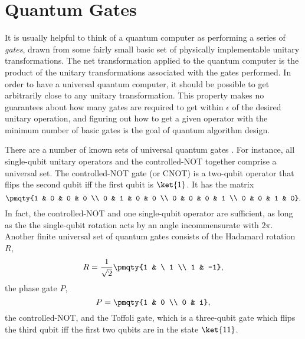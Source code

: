 \appendix

\chapter{Quantum Gates}
\label{app-gates}

It is usually helpful to think of a quantum computer as performing a series
of {\em gates}, drawn from some fairly small basic set of physically
implementable unitary transformations.  The net transformation applied
to the quantum computer is the product of the unitary transformations
associated with the gates performed.  In order to have a universal quantum
computer, it should be possible to get arbitrarily close to any unitary
transformation.  This property makes no guarantees about how many gates
are required to get within $\epsilon$ of the desired unitary operation,
and figuring out how to get a given operator with the minimum
number of basic gates is the goal of quantum algorithm design.

There are a number of known sets of universal quantum gates
\cite{lloyd-universal, gates}.  For instance, all single-qubit unitary
operators and the controlled-NOT together comprise a universal set.  The
controlled-NOT gate (or CNOT) is a two-qubit operator that flips the second
qubit iff the first qubit is $\ket{1}$.  It has the matrix
\begin{equation}
	\pmqty{1 & 0 & 0 & 0 \\ 0 & 1 & 0 & 0 \\ 0 & 0 & 0 & 1 \\ 0 & 0 & 1 & 0}.
\end{equation}
In fact, the controlled-NOT and one single-qubit operator are sufficient,
as long as the the single-qubit rotation acts by an angle incommensurate
with $2 \pi$.  Another finite universal set of quantum gates consists of the
Hadamard rotation $R$,
\begin{equation}
	R = \frac{1}{\sqrt{2}} \pmqty{1 & \ 1 \\ 1 & -1},
\end{equation}
the phase gate $P$,
\begin{equation}
	P = \pmqty{1 & 0 \\ 0 & i},
\end{equation}
the controlled-NOT, and the Toffoli gate, which is a three-qubit gate which
flips the third qubit iff the first two qubits are in the state $\ket{11}$.

